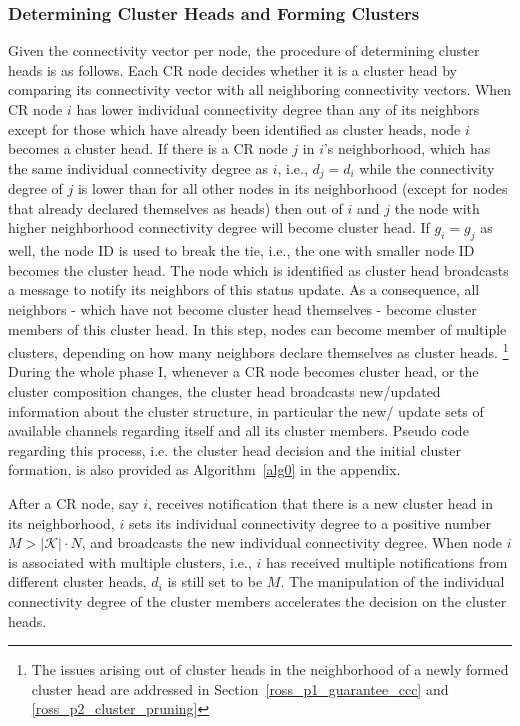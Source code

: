 \documentclass[times]{ettauth}
\newcommand{\ie}{i.e., }
\theoremstyle{mytheoremstyle}
\theoremstyle{mytheoremstyle}
\theoremstyle{mytheoremstyle}
\begin{document}
\subsubsection{Determining Cluster Heads and Forming Clusters}
Given the connectivity vector per node, the procedure of determining cluster heads is as follows.
Each CR node decides whether it is a cluster head by comparing its connectivity vector with all neighboring connectivity vectors.
When CR node $i$ has lower individual connectivity degree than any of its neighbors except for those which have already been identified as cluster heads, node $i$ becomes a cluster head.
If there is a CR node $j$ in $i$'s neighborhood, which has the same individual connectivity degree as $i$, \ie $d_j = d_i$ while the connectivity degree of  $j$ is lower than for all other nodes in its neighborhood (except for nodes that already declared themselves as heads) then out of $i$ and $j$ the node with higher neighborhood connectivity degree will become cluster head.
If $g_i = g_j$ as well, the node ID is used to break the tie, \ie the one with smaller node ID becomes the cluster head.
%
The node which is identified as cluster head broadcasts a message to notify its neighbors of this status update. 
As a consequence, all neighbors - which have not become cluster head themselves -  become cluster members of this cluster head.
In this step, nodes can become member of multiple clusters, depending on how many neighbors declare themselves as cluster heads.
\footnote{The issues arising out of cluster heads in the neighborhood of a newly formed cluster head are addressed in Section~\ref{ross_p1_guarantee_ccc} and \ref{ross_p2_cluster_pruning}}
During the whole phase I, whenever a CR node becomes cluster head, or the cluster composition changes, the cluster head broadcasts new/updated information about the cluster structure, in particular the new/ update sets of available channels regarding itself and all its cluster members.
Pseudo code regarding this process, i.e. the cluster head decision and the initial cluster formation, is also provided as Algorithm~\ref{alg0} in the appendix.

After a CR node, say $i$, receives notification that there is a new cluster head in its neighborhood, $i$ sets its individual connectivity degree to a positive number $M > |\mathcal{K}| \cdot N$, and broadcasts the new individual connectivity degree. 
When node $i$ is associated with multiple clusters, \ie $i$ has received multiple notifications from different cluster heads, $d_i$ is still set to be $M$. 
The manipulation of the individual connectivity degree of the cluster members accelerates the decision on the cluster heads.
\end{document}
